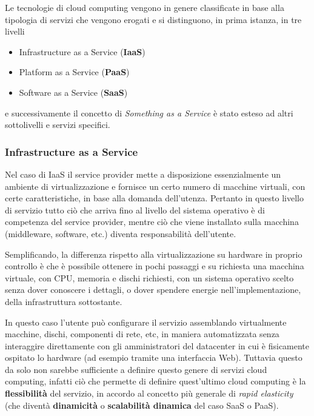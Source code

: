 Le tecnologie di cloud computing vengono in genere classificate in base
alla tipologia di servizi che vengono erogati e si distinguono, in prima
istanza, in tre livelli

\begin{itemize}
\tightlist
\item
  Infrastructure as a Service (\textbf{IaaS})
\item
  Platform as a Service (\textbf{PaaS})
\item
  Software as a Service (\textbf{SaaS})
\end{itemize}

e successivamente il concetto di \emph{Something as a Service} è stato
esteso ad altri sottolivelli e servizi specifici.

\subsubsection{Infrastructure as a
Service}\label{infrastructure-as-a-service}

Nel caso di IaaS il service provider mette a disposizione essenzialmente
un ambiente di virtualizzazione e fornisce un certo numero di macchine
virtuali, con certe caratteristiche, in base alla domanda dell'utenza.
Pertanto in questo livello di servizio tutto ciò che arriva fino al
livello del sistema operativo è di competenza del service provider,
mentre ciò che viene installato sulla macchina (middleware, software,
etc.) diventa responsabilità dell'utente.

Semplificando, la differenza rispetto alla virtualizzazione su hardware
in proprio controllo è che è possibile ottenere in pochi passaggi e su
richiesta una macchina virtuale, con CPU, memoria e dischi richiesti,
con un sistema operativo scelto senza dover conoscere i dettagli, o
dover spendere energie nell'implementazione, della infrastruttura
sottostante.

In questo caso l'utente può configurare il servizio assemblando
virtualmente macchine, dischi, componenti di rete, etc, in maniera
automatizzata senza interaggire direttamente con gli amministratori del
datacenter in cui è fisicamente ospitato lo hardware (ad esempio tramite
una interfaccia Web). Tuttavia questo da solo non sarebbe sufficiente a
definire questo genere di servizi cloud computing, infatti ciò che
permette di definire quest'ultimo cloud computing è la
\textbf{flessibilità} del servizio, in accordo al concetto più generale
di \emph{rapid elasticity} (che diventà \textbf{dinamicità} o
\textbf{scalabilità dinamica} del caso SaaS o PaaS).

